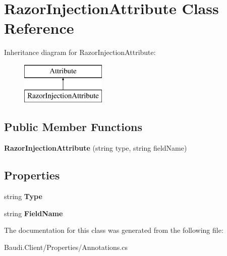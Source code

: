 \hypertarget{class_razor_injection_attribute}{}\section{Razor\+Injection\+Attribute Class Reference}
\label{class_razor_injection_attribute}
Inheritance diagram for Razor\+Injection\+Attribute\+:\begin{figure}[H]
\begin{center}
\leavevmode
\includegraphics[height=2.000000cm]{class_razor_injection_attribute}
\end{center}
\end{figure}
\subsection*{Public Member Functions}
\begin{DoxyCompactItemize}
\item 
\hypertarget{class_razor_injection_attribute_a16b318ef8474449bae084dbe8377d77e}{}{\bfseries Razor\+Injection\+Attribute} (string type, string field\+Name)\label{class_razor_injection_attribute_a16b318ef8474449bae084dbe8377d77e}

\end{DoxyCompactItemize}
\subsection*{Properties}
\begin{DoxyCompactItemize}
\item 
\hypertarget{class_razor_injection_attribute_a03ab3ec12db49f3eeca9d462b95bb6fd}{}string {\bfseries Type}\label{class_razor_injection_attribute_a03ab3ec12db49f3eeca9d462b95bb6fd}

\item 
\hypertarget{class_razor_injection_attribute_ace7a81f227c76db0a47cca6edb85a911}{}string {\bfseries Field\+Name}\label{class_razor_injection_attribute_ace7a81f227c76db0a47cca6edb85a911}

\end{DoxyCompactItemize}


The documentation for this class was generated from the following file\+:\begin{DoxyCompactItemize}
\item 
Baudi.\+Client/\+Properties/Annotations.\+cs\end{DoxyCompactItemize}
